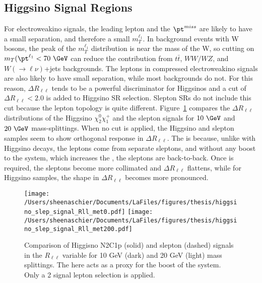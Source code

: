  \subsection{Higgsino Signal Regions}
\label{sec:sr:mll}
For electroweakino signals, the leading lepton and the $\pt^{miss}$ are likely to have a small separation, and therefore a small $m_T^{\ell_1}$.  In background events with W bosons, the peak of the $m_T^{\ell_1}$ distribution is near the mass of the W, so cutting on $m_T(\pt^{\ell_1} < 70~\GeV$ can reduce the contribution from $t\bar{t}$, $WW/WZ$, and $W(\rightarrow\ell\nu)$+jets backgrounds.  The leptons in compressed electroweakino signals are also likely to have small separation, while most backgrounds do not.  For this reason, $\Delta R_{\ell\ell}$ tends to be a powerful discriminator for Higgsinos and a cut of $\Delta R_{\ell\ell} < 2.0$ is added to Higgsino SR selection.  Slepton SRs do not include this cut because the lepton topology is quite different.  Figure~\ref{fig:Rll_signals only} compares the $\Delta R_{\ell\ell}$ distributions of the Higgsino $\chi_2^0\chi_1^+$ and the slepton signals for $10~\GeV$ and $20~\GeV$ mass-splittings.  When no \met cut is applied, the Higgsino and slepton samples seem to show orthogonal response in $\Delta R_{\ell\ell}$.  The is because, unlike with Higgsino decays, the leptons come from separate sleptons, and without any boost to the system, which increases the \met, the sleptons are back-to-back.  Once \met is required, the sleptons become more collimated and $\Delta R_{\ell\ell}$ flattens, while for Higgsino samples, the shape in $\Delta R_{\ell\ell}$ becomes more pronounced. 
  \begin{figure}[tbp]
     \texttt{[image: /Users/sheenaschier/Documents/LaFiles/figures/thesis/higgsino\_slep\_signal\_Rll\_met0.pdf]}
     \texttt{[image: /Users/sheenaschier/Documents/LaFiles/figures/thesis/higgsino\_slep\_signal\_Rll\_met200.pdf]}\\
   \caption{Comparison of Higgisno N2C1p (solid) and slepton (dashed) signals in the $R_{\ell\ell}$ variable for 10 GeV (dark) and 20 GeV (light) mass splittings. The \met{} here acts as a proxy for the boost of the system. Only a 2 signal lepton selection is applied.}
   \label{fig:Rll_signals only}
 \end{figure}

